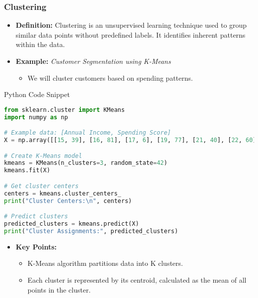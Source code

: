 \documentclass[aspectratio=169]{beamer}
\begin{document}
\begin{frame}[fragile]
    \frametitle{Clustering}
    \begin{itemize}
        \item \textbf{Definition:} Clustering is an unsupervised learning technique used to group similar data points without predefined labels. It identifies inherent patterns within the data.
        \item \textbf{Example:} \textit{Customer Segmentation using K-Means}
        \begin{itemize}
            \item We will cluster customers based on spending patterns.
        \end{itemize}
    \end{itemize}

    \begin{block}{Python Code Snippet}
    \begin{lstlisting}[language=Python]
from sklearn.cluster import KMeans
import numpy as np

# Example data: [Annual Income, Spending Score]
X = np.array([[15, 39], [16, 81], [17, 6], [19, 77], [21, 40], [22, 60]])

# Create K-Means model
kmeans = KMeans(n_clusters=3, random_state=42)
kmeans.fit(X)

# Get cluster centers
centers = kmeans.cluster_centers_
print("Cluster Centers:\n", centers)

# Predict clusters
predicted_clusters = kmeans.predict(X)
print("Cluster Assignments:", predicted_clusters)
    \end{lstlisting}
    \end{block}

    \begin{itemize}
        \item \textbf{Key Points:}
        \begin{itemize}
            \item K-Means algorithm partitions data into K clusters.
            \item Each cluster is represented by its centroid, calculated as the mean of all points in the cluster.
        \end{itemize}
    \end{itemize}
\end{frame}
\end{document}
